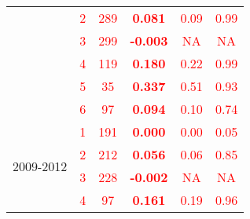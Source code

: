 \begin{table}
\begin{tabular}{rrrrrr}
    \multicolumn{1}{c}{} & \multicolumn{1}{c}{\textcolor{red}{2}} & \multicolumn{1}{c}{\textcolor{red}{289}} & \multicolumn{1}{c}{\textcolor{red}{\textbf{0.081}}} & \multicolumn{1}{c}{\textcolor{red}{0.09}} & \multicolumn{1}{c}{\textcolor{red}{0.99}} \\
    \multicolumn{1}{c}{} & \multicolumn{1}{c}{\textcolor{red}{3}} & \multicolumn{1}{c}{\textcolor{red}{299}} & \multicolumn{1}{c}{\textcolor{red}{\textbf{-0.003}}} & \multicolumn{1}{c}{\textcolor{red}{NA}} & \multicolumn{1}{c}{\textcolor{red}{NA}} \\
    \multicolumn{1}{c}{} & \multicolumn{1}{c}{\textcolor{red}{4}} & \multicolumn{1}{c}{\textcolor{red}{119}} & \multicolumn{1}{c}{\textcolor{red}{\textbf{0.180}}} & \multicolumn{1}{c}{\textcolor{red}{0.22}} & \multicolumn{1}{c}{\textcolor{red}{0.99}} \\
    \multicolumn{1}{c}{} & \multicolumn{1}{c}{\textcolor{red}{5}} & \multicolumn{1}{c}{\textcolor{red}{35}} & \multicolumn{1}{c}{\textcolor{red}{\textbf{0.337}}} & \multicolumn{1}{c}{\textcolor{red}{0.51}} & \multicolumn{1}{c}{\textcolor{red}{0.93}} \\
    \multicolumn{1}{c}{} & \multicolumn{1}{c}{\textcolor{red}{6}} & \multicolumn{1}{c}{\textcolor{red}{97}} & \multicolumn{1}{c}{\textcolor{red}{\textbf{0.094}}} & \multicolumn{1}{c}{\textcolor{red}{0.10}} & \multicolumn{1}{c}{\textcolor{red}{0.74}} \\\midrule
    \multicolumn{1}{c}{\multirow{6}[2]{*}{\begin{sideways}2009-2012\end{sideways}}} & \multicolumn{1}{c}{\textcolor{red}{1}} & \multicolumn{1}{c}{\textcolor{red}{191}} & \multicolumn{1}{c}{\textcolor{red}{\textbf{0.000}}} & \multicolumn{1}{c}{\textcolor{red}{0.00}} & \multicolumn{1}{c}{\textcolor{red}{0.05}} \\
    \multicolumn{1}{c}{} & \multicolumn{1}{c}{\textcolor{red}{2}} & \multicolumn{1}{c}{\textcolor{red}{212}} & \multicolumn{1}{c}{\textcolor{red}{\textbf{0.056}}} & \multicolumn{1}{c}{\textcolor{red}{0.06}} & \multicolumn{1}{c}{\textcolor{red}{0.85}} \\
    \multicolumn{1}{c}{} & \multicolumn{1}{c}{\textcolor{red}{3}} & \multicolumn{1}{c}{\textcolor{red}{228}} & \multicolumn{1}{c}{\textcolor{red}{\textbf{-0.002}}} & \multicolumn{1}{c}{\textcolor{red}{NA}} & \multicolumn{1}{c}{\textcolor{red}{NA}} \\
    \multicolumn{1}{c}{} & \multicolumn{1}{c}{\textcolor{red}{4}} & \multicolumn{1}{c}{\textcolor{red}{97}} & \multicolumn{1}{c}{\textcolor{red}{\textbf{0.161}}} & \multicolumn{1}{c}{\textcolor{red}{0.19}} & \multicolumn{1}{c}{\textcolor{red}{0.96}} \\

\end{tabular}
\end{table}
